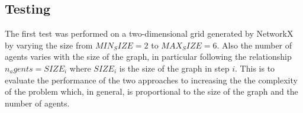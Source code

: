 \documentclass[12pt, a4paper, hidelinks]{article}
\numberwithin{equation}{section}
\begin{document}
\subsection{Testing}\label{subsec:testing}
The first test was performed on a two-dimensional grid generated by NetworkX by varying the size from $MIN_SIZE=2$ to $MAX_SIZE=6$.
Also the number of agents varies with the size of the graph, in particular following the relationship $n_agents = SIZE_i$ where $SIZE_i$ is the size of the graph in step $i$.
This is to evaluate the performance of the two approaches to increasing the the complexity of the problem which, in general, is proportional to the size of the graph and the number of agents.
\end{document}

